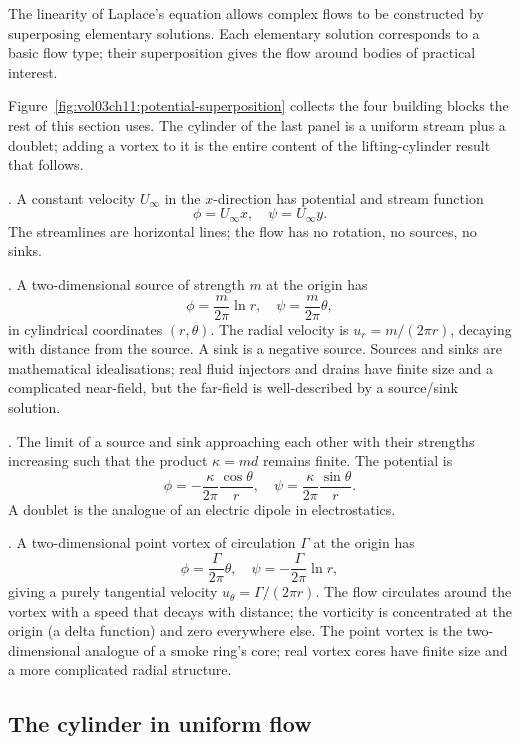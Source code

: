 The linearity of Laplace's equation allows complex flows to be
constructed by superposing elementary solutions. Each elementary
solution corresponds to a basic flow type; their superposition
gives the flow around bodies of practical interest.



Figure~\ref{fig:vol03ch11:potential-superposition} collects the four
building blocks the rest of this section uses. The cylinder of the
last panel is a uniform stream plus a doublet; adding a vortex to it
is the entire content of the lifting-cylinder result that follows.

. A constant velocity $U_\infty$ in the
$x$-direction has potential and stream function
\[
\phi = U_\infty x, \quad \psi = U_\infty y.
\]
The streamlines are horizontal lines; the flow has no rotation, no
sources, no sinks.

. A two-dimensional source of strength $m$
at the origin has
\[
\phi = \frac{m}{2\pi}\ln r, \quad \psi = \frac{m}{2\pi}\theta,
\]
in cylindrical coordinates $(r, \theta)$. The radial velocity is
$u_r = m/(2\pi r)$, decaying with distance from the source. A
sink is a negative source. Sources and sinks are mathematical
idealisations; real fluid injectors and drains have finite size
and a complicated near-field, but the far-field is well-described
by a source/sink solution.

. The limit of a source and sink approaching each
other with their strengths increasing such that the product
$\kappa = m d$ remains finite. The potential is
\[
\phi = -\frac{\kappa}{2\pi}\frac{\cos\theta}{r}, \quad
\psi = \frac{\kappa}{2\pi}\frac{\sin\theta}{r}.
\]
A doublet is the analogue of an electric dipole in electrostatics.

. A two-dimensional point vortex of
circulation $\Gamma$ at the origin has
\[
\phi = \frac{\Gamma}{2\pi}\theta, \quad
\psi = -\frac{\Gamma}{2\pi}\ln r,
\]
giving a purely tangential velocity $u_\theta = \Gamma/(2\pi r)$.
The flow circulates around the vortex with a speed that decays
with distance; the vorticity is concentrated at the origin (a
delta function) and zero everywhere else. The point vortex is the
two-dimensional analogue of a smoke ring's core; real vortex cores
have finite size and a more complicated radial structure.

\subsection{The cylinder in uniform flow}

